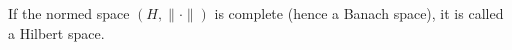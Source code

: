 If the normed space $(H, \|\cdot\|)$ is complete (hence a Banach space), it is called a Hilbert space.
